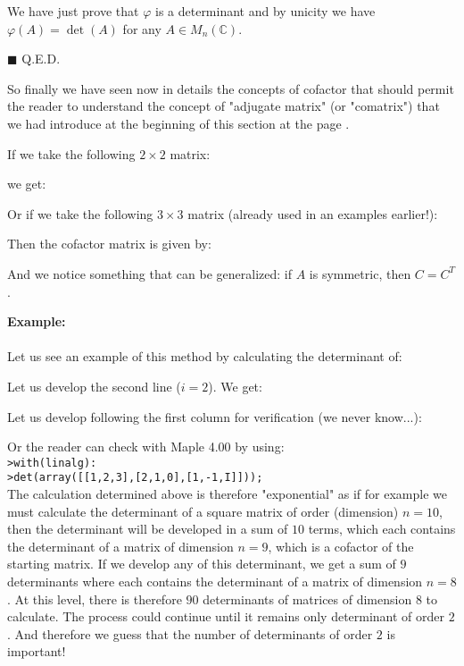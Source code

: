 \begin{enumerate}
\begin{dem}
		We have just prove that $\varphi$ is a determinant and by unicity we have $\varphi(A)=\det(A)$ for any $A\in M_n(\mathbb{C})$.
		\begin{flushright}
			$\blacksquare$  Q.E.D.
		\end{flushright}
		\end{dem}
		
		\begin{tcolorbox}[title=Remark,colframe=black,arc=10pt]
		So finally we have seen now in details the concepts of cofactor that should permit the reader to understand the concept of "adjugate matrix" (or "comatrix") that we had introduce at the beginning of this section at the page \pageref{adjugate}.
		\end{tcolorbox}
		If we take the following $2\times 2$ matrix:
		
		we get:
		
		Or if we take the following $3\times 3$ matrix (already used in an examples earlier!):
		
		Then the cofactor matrix is given by:
		
		And we notice something that can be generalized: if $A$ is symmetric, then $C=C^T$.
	
		\begin{tcolorbox}[colframe=black,colback=white,sharp corners]
		\textbf{{\Large {}}Example:}\\\\
		Let us see an example of this method by calculating the determinant of: 
		
		Let us develop the second line ($i=2$). We get:
		\end{tcolorbox}
		
		\pagebreak
		\begin{tcolorbox}[colframe=black,colback=white,sharp corners]
			
		Let us develop following the first column for verification (we never know...):
		
		Or the reader can check with Maple 4.00 by using:\\
	
		\texttt{>with(linalg):}\\
		\texttt{>det(array([[1,2,3],[2,1,0],[1,-1,I]]));}\\
		
		The calculation determined above is therefore "exponential" as if for example we must calculate the determinant of a square matrix of order (dimension) $n=10$, then the determinant will be developed in a sum of $10$ terms, which each contains the determinant of a matrix of dimension $n=9$, which is a cofactor of the starting matrix. If we develop any of this determinant, we get a sum of $9$ determinants where each contains the determinant of a matrix of dimension $n=8$. At this level, there is therefore $90$ determinants of matrices of dimension $8$ to calculate. The process could continue until it remains only determinant of order $2$. And therefore we guess that the number of determinants of order $2$ is important!
		\end{tcolorbox}
		

\end{enumerate}
